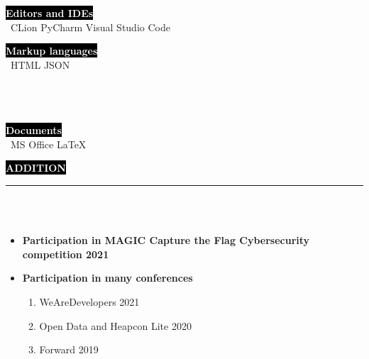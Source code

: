\documentclass[9pt]{developercv} %
\begin{document}
\begin{minipage}[t]{0.4\textwidth}
	\vspace{-\baselineskip}
	
	\colorbox{black}{{\textcolor{white}{\textbf{Editors and IDEs}}}}\smallskip\\\
	{CLion} \hspace{10} {PyCharm} \hspace{10} {Visual Studio Code}\smallskip\\
\end{minipage}
\hfill
\begin{minipage}[t]{0.3\textwidth}
	\vspace{-\baselineskip}
	
	\colorbox{black}{{\textcolor{white}{\textbf{Markup languages}}}}\smallskip\\\
	{HTML} \hspace{10} {JSON}\smallskip\\\\\\\
\end{minipage}
\hfill
\begin{minipage}[t]{0.2\textwidth}
	\vspace{-\baselineskip}
	
	\colorbox{black}{{\textcolor{white}{\textbf{Documents}}}}\smallskip\\\
	{MS Office} \hspace{10} {LaTeX}\\
\end{minipage}


\colorbox{black}{{\textcolor{white}{\textbf{\MakeUppercase{Addition}}}}}
\par\noindent\rule{\textwidth}{2px}\\\\

\begin{minipage}[t]{0.45\textwidth}
    \vspace{-\baselineskip}
    \begin{itemize}
        \item {\textbf{Participation in MAGIC Capture the Flag Cybersecurity competition 2021}}
        \item {\textbf{Participation in many conferences}}
        \begin{enumerate}
            \item WeAreDevelopers 2021
            \item Open Data and Heapcon Lite 2020
            \item Forward 2019
        \end{enumerate}
    \end{itemize}
\end{minipage}
\end{document}
